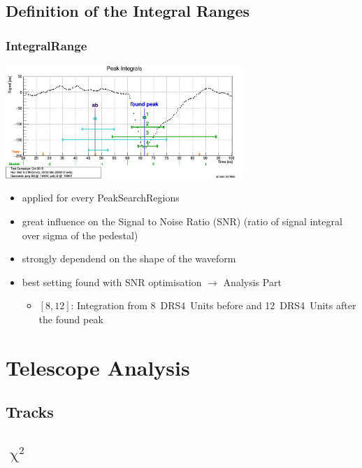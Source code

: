 \documentclass[9pt]{beamer}
\begin{document}
\subsection{Definition of the Integral Ranges}
\begin{frame}
	\frametitle{IntegralRange}
	\begin{center}
		\includegraphics[width=9cm]{IntegralPeaks}
	\end{center}
	\begin{itemize}
		\item applied for every PeakSearchRegions
		\item great influence on the Signal to Noise Ratio (SNR) (ratio of signal integral over sigma of the pedestal)
		\item strongly dependend on the shape of the waveform
		\item best setting found with SNR optimisation $\rightarrow$ Analysis Part
		\begin{itemize}
			\item $[8,12]$: Integration from \SI{8}{DRS4 Units} before and \SI{12}{DRS4 Units} after the found peak
		\end{itemize}

	\end{itemize}
\end{frame}
\section{Telescope Analysis}
\subsection{Tracks}
\begin{frame}
\end{frame}
\subsection{\texorpdfstring{$\upchi^{2}$}{chi2}}
\begin{frame}
\end{frame}
\end{document}
